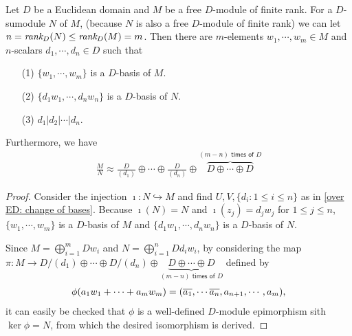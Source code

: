 \begin{cor}\label{corollary over Z}
    Let $D$ be a Euclidean domain and $M$ be a free $D$-module of finite rank.
    For a $D$-sumodule $N$ of $M$, (because $N$ is also a free $D$-module of finite rank) we can let $n=\textit{rank}_D(N)\leq\textit{rank}_D(M)=m$.
    Then there are $m$-elements $w_1, \cdots, w_m\in M$ and $n$-scalars $d_1, \cdots, d_n\in D$ such that
    \begin{enumerate}
        \item[(1)]
        {
            $\{w_1, \cdots, w_m\}$ is a $D$-basis of $M$.
        }
        \item[(2)]
        {
            $\{d_1w_1, \cdots, d_nw_n\}$ is a $D$-basis of $N$.
        }
        \item[(3)]
        {
            $d_1|d_2|\cdots|d_n$.
        }
    \end{enumerate}
    Furthermore, we have
    \begin{align*}
        \frac{M}{N} \approx \frac{D}{(d_1)}\oplus\cdots\oplus \frac{D}{(d_n)}\oplus\overbrace{D\oplus\cdots\oplus D}^{(m-n)\textsf{ times of }D}
    \end{align*}
\end{cor}
\begin{proof}
    Consider the injection $\imath: N\hookrightarrow M$ and find $U, V, \{d_i: 1\leq i\leq n\}$ as in \cref{over ED: change of bases}.
    Because $\imath(N)=N$ and $\imath(z_j)=d_jw_j$ for $1\leq j\leq n$, $\{w_1, \cdots, w_m\}$ is a $D$-basis of $M$ and $\{d_1w_1, \cdots, d_nw_n\}$ is a $D$-basis of $N$.

    Since $M=\bigoplus_{i=1}^m Dw_i$ and $N=\bigoplus_{i=1}^n Dd_iw_i$, by considering the map $\pi: M\rightarrow D/(d_1)\oplus\cdots\oplus D/(d_n)\oplus\underbrace{D\oplus\cdots\oplus D}_{(m-n)\textsf{ times of }D}$ defined by
    \begin{align*}
        \phi(a_1w_1+\cdots+a_mw_m)=(\overline{a_1}, \cdots \overline{a_n}, a_{n+1}, \cdots, a_m),
    \end{align*}
    it can easily be checked that $\phi$ is a well-defined $D$-module epimorphism sith $\ker\phi=N$, from which the desired isomorphism is derived.
\end{proof}
